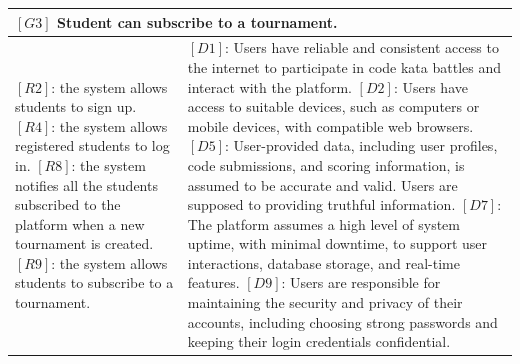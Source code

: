 \begin{table}[H]
    \centering
\begin{tabular}{|p{8cm}|p{8cm}|}
  \hline
  \multicolumn{2}{|p{16cm}|}{\textbf{$[G3]$ Student can subscribe to a tournament.}} \\
  \hline
  {
  $[R2]$: the system allows students to sign up.
  \newline$[R4]$: the system allows registered students to log in.
  \newline$[R8]$: the system notifies all the students subscribed to the platform when a new tournament is created.
  \newline$[R9]$: the system allows students to subscribe to a tournament.
  }
  & 
  {
  $[D1]$: Users have reliable and consistent access to the internet to participate in code kata battles and interact with the platform.
  \newline$[D2]$: Users have access to suitable devices, such as computers or mobile devices, with compatible web browsers.
  \newline$[D5]$: User-provided data, including user profiles, code submissions, and scoring information, is assumed to be accurate and valid. Users are supposed to providing truthful information.
  \newline$[D7]$: The platform assumes a high level of system uptime, with minimal downtime, to support user interactions, database storage, and real-time features.
  \newline$[D9]$: Users are responsible for maintaining the security and privacy of their accounts, including choosing strong passwords and keeping their login credentials confidential.
  }
  \\
  \hline
\end{tabular}
\end{table}

